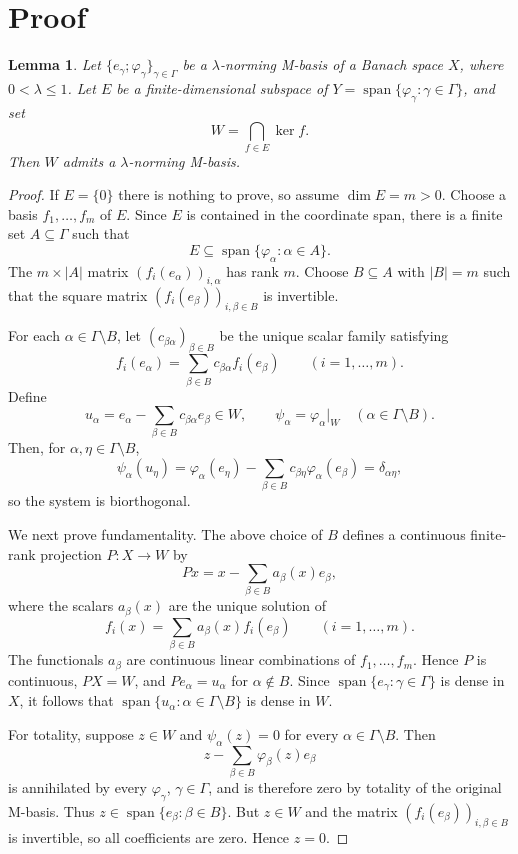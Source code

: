 \documentclass[11pt]{article}
\newtheorem{lemma}{Lemma}
\newcommand{\X}{X}
\newcommand{\spn}{\operatorname{span}}
\begin{document}
\section*{Proof}

\begin{lemma}\label{lem:coordinate-finite-codim}
Let $\{e_\gamma;\varphi_\gamma\}_{\gamma\in\Gamma}$ be a
$\lambda$-norming M-basis of a Banach space $\X$, where $0<\lambda\le 1$.
Let $E$ be a finite-dimensional subspace of
$Y=\spn\{\varphi_\gamma:\gamma\in\Gamma\}$, and set
\[
    W=\bigcap_{f\in E}\ker f .
\]
Then $W$ admits a $\lambda$-norming M-basis.
\end{lemma}

\begin{proof}
If $E=\{0\}$ there is nothing to prove, so assume $\dim E=m>0$.
Choose a basis $f_1,\ldots,f_m$ of $E$. Since $E$ is contained in the
coordinate span, there is a finite set $A\subseteq\Gamma$ such that
\[
    E\subseteq \spn\{\varphi_\alpha:\alpha\in A\}.
\]
The $m\times |A|$ matrix $(f_i(e_\alpha))_{i,\alpha}$ has rank $m$.
Choose $B\subseteq A$ with $|B|=m$ such that the square matrix
$(f_i(e_\beta))_{i,\beta\in B}$ is invertible.

For each $\alpha\in\Gamma\setminus B$, let $(c_{\beta\alpha})_{\beta\in B}$
be the unique scalar family satisfying
\[
    f_i(e_\alpha)=\sum_{\beta\in B} c_{\beta\alpha} f_i(e_\beta)
    \qquad (i=1,\ldots,m).
\]
Define
\[
    u_\alpha=e_\alpha-\sum_{\beta\in B}c_{\beta\alpha}e_\beta
    \in W,\qquad
    \psi_\alpha=\varphi_\alpha|_{W}
    \quad(\alpha\in\Gamma\setminus B).
\]
Then, for $\alpha,\eta\in\Gamma\setminus B$,
\[
    \psi_\alpha(u_\eta)
      =\varphi_\alpha(e_\eta)
       -\sum_{\beta\in B}c_{\beta\eta}\varphi_\alpha(e_\beta)
      =\delta_{\alpha\eta},
\]
so the system is biorthogonal.

We next prove fundamentality. The above choice of $B$ defines a continuous
finite-rank projection $P:\X\to W$ by
\[
    Px=x-\sum_{\beta\in B} a_\beta(x)e_\beta,
\]
where the scalars $a_\beta(x)$ are the unique solution of
\[
    f_i(x)=\sum_{\beta\in B} a_\beta(x) f_i(e_\beta)
    \qquad (i=1,\ldots,m).
\]
The functionals $a_\beta$ are continuous linear combinations of
$f_1,\ldots,f_m$. Hence $P$ is continuous, $P\X=W$, and
$P e_\alpha=u_\alpha$ for $\alpha\notin B$. Since
$\spn\{e_\gamma:\gamma\in\Gamma\}$ is dense in $\X$, it follows that
$\spn\{u_\alpha:\alpha\in\Gamma\setminus B\}$ is dense in $W$.

For totality, suppose $z\in W$ and $\psi_\alpha(z)=0$ for every
$\alpha\in\Gamma\setminus B$. Then
\[
    z-\sum_{\beta\in B}\varphi_\beta(z)e_\beta
\]
is annihilated by every $\varphi_\gamma$, $\gamma\in\Gamma$, and is therefore
zero by totality of the original M-basis. Thus
$z\in\spn\{e_\beta:\beta\in B\}$. But $z\in W$ and the matrix
$(f_i(e_\beta))_{i,\beta\in B}$ is invertible, so all coefficients are zero.
Hence $z=0$.


\end{proof}
\end{document}
